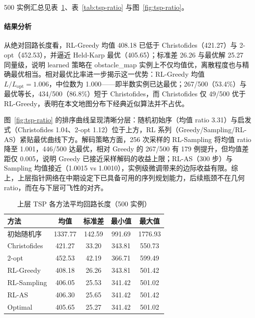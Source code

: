 500 实例汇总见表~\ref{tab:tsp-length}、表~\ref{tab:tsp-ratio} 与图~\ref{fig:tsp-ratio}。

\paragraph{结果分析}
从绝对回路长度看，RL-Greedy 均值 408.18 已低于 Christofides（421.27）与 2-opt（452.53），并逼近 Held-Karp 最优（405.65）；标准差 26.26 与最优解 25.27 同量级，说明 learned 策略在 obstacle\_map 实例上不仅均值优，离散程度也与精确最优相当。相对最优比率进一步揭示这一优势：RL-Greedy 均值 $L/L_{\mathrm{opt}}=1.006$，中位数为 1.000——即半数实例已达最优；267/500（53.4\%）与最优等长，434/500（86.8\%）短于 Christofides，而 Christofides 仅 49/500 优于 RL-Greedy，表明在本文地图分布下经典近似算法并不占优。

图~\ref{fig:tsp-ratio} 的排序曲线呈现清晰分层：随机初始序（均值 ratio 3.31）与启发式（Christofides 1.04、2-opt 1.12）位于上方，RL 系列（Greedy/Sampling/RL-AS）紧贴最优曲线下方。解码策略方面，256 次采样的 RL-Sampling 将均值 ratio 降至 1.001，446/500 达最优，相对 Greedy 的 267/500 有 179 例提升，但均值差距仅 0.005，说明 Greedy 已接近采样解码的收益上限；RL-AS（300 步）与 Sampling 均值接近（1.0015 vs 1.0010），实例级微调带来的边际收益有限。综上，上层指针网络在中期设定下已具备可用的序列规划能力，后续瓶颈不在几何 ratio，而在与下层可飞性的对齐。

\begin{table}[htbp]
  \centering
  \caption{上层 TSP 各方法平均回路长度（500 实例）}
  \label{tab:tsp-length}
  \begin{tabular}{lcccc}
    \toprule
    方法 & 均值 & 标准差 & 最小值 & 最大值 \\
    \midrule
    初始随机序   & 1337.77 & 142.59 & 991.69  & 1776.93 \\
    Christofides & 421.27  & 33.20  & 343.81  & 550.73  \\
    2-opt        & 452.53  & 42.19  & 366.71  & 599.49  \\
    RL-Greedy    & 408.18  & 26.26  & 343.81  & 501.42  \\
    RL-Sampling  & 406.05  & 25.53  & 341.42  & 501.02  \\
    RL-AS        & 406.30  & 25.65  & 341.42  & 501.42  \\
    Optimal      & 405.65  & 25.27  & 341.42  & 501.02  \\
    \bottomrule
  \end{tabular}
\end{table}

